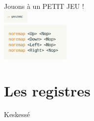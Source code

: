 \documentclass[10pt]{beamer}
\begin{document}
	\begin{frame}[standout]
		Jouons à un PETIT JEU !\\
		\vspace{10pt}
		\includegraphics[width=48]{img/edit-vimrc.png}\\
		\vspace{10pt}
		\includegraphics[width=128]{img/harder.png}
	\end{frame}

\section{Les registres}
	\begin{frame}{Keskessé}
	\end{frame}
\end{document}

